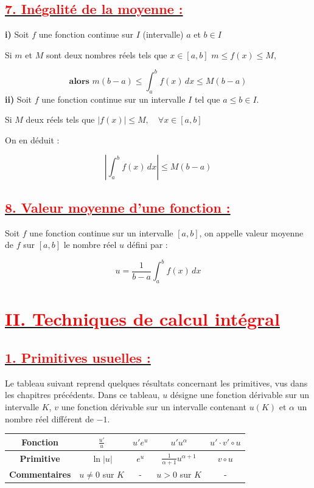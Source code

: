 \documentclass[12pt,a4paper]{article}
\begin{document}
\subsection*{\underline{\textbf{\textcolor{red}{7. Inégalité de la moyenne :}}}}

\textbf{i)} Soit \( f \) une fonction continue sur \( I \) (intervalle) \( a \) et \( b \in I \)

Si \( m \) et \( M \) sont deux nombres réels tels que \( x \in [a, b] \) \( m \leq f(x) \leq M \),  

\[
\textbf{alors }m (b - a) \leq \int_a^b f(x) \, dx \leq M(b - a)
\]  
\textbf{ii)} Soit \( f \) une fonction continue sur un intervalle \( I \) tel que \( a \leq b \in I \).

Si  \( M \) deux réels tels que \(|f(x)| \leq M, \quad \forall x \in [a,b]\)

On en déduit :

\[
\left| \int_a^b f(x) \, dx \right| \leq M (b-a)
\]

\subsection*{\underline{\textbf{\textcolor{red}{8. Valeur moyenne d'une fonction :}}}}

Soit \( f \) une fonction continue sur un intervalle \( [a, b] \), on appelle valeur moyenne de \( f \) sur \( [a, b] \) le nombre réel \( u \) défini par :

\[
u = \frac{1}{b - a} \int_a^b f(x) \, dx
\]
\section*{\underline{\textbf{\textcolor{red}{II. Techniques de calcul intégral}}}}

\subsection*{\underline{\textbf{\textcolor{red}{1. Primitives usuelles :}}}}

Le tableau suivant reprend quelques résultats concernant les primitives, vus dans les chapitres précédents. Dans ce tableau, \( u \) désigne une fonction dérivable sur un intervalle \( K \), \( v \) une fonction dérivable sur un intervalle contenant \( u(K) \) et \( \alpha \) un nombre réel différent de \( -1 \).

\begin{tabular}{|c|c|c|c|c|}
\hline
\textbf{Fonction} & \( \frac{u'}{u} \) & \( u' e^u \) & \( u' u^\alpha \) & \( u' \cdot v' \circ u \) \\
\hline
\textbf{Primitive} & \( \ln |u| \) & \( e^u \) & \( \frac{1}{\alpha + 1} u^{\alpha + 1} \) & \( v \circ u \) \\
\hline
\textbf{Commentaires} & \( u \neq 0 \) sur \( K \) & - & \( u > 0 \) sur \( K \) & - \\
\hline
\end{tabular}
\end{document}
